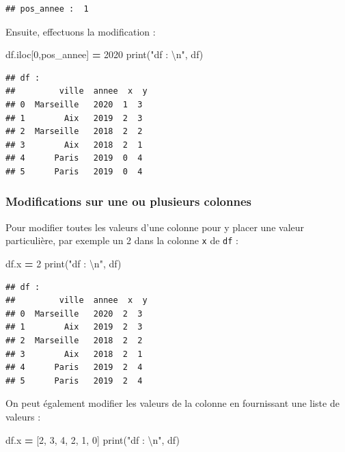 \documentclass[12pt,]{book}
\newenvironment{Shaded}{\begin{snugshade}}{\end{snugshade}}
\newcommand{\DecValTok}[1]{\textcolor[rgb]{0.00,0.00,0.81}{#1}}
\newcommand{\CharTok}[1]{\textcolor[rgb]{0.31,0.60,0.02}{#1}}
\newcommand{\StringTok}[1]{\textcolor[rgb]{0.31,0.60,0.02}{#1}}
\newcommand{\OperatorTok}[1]{\textcolor[rgb]{0.81,0.36,0.00}{\textbf{#1}}}
\newcommand{\BuiltInTok}[1]{#1}
\newcommand{\NormalTok}[1]{#1}
\numberwithin{equation}{section}
\numberwithin{countremarque}{section}
\begin{document}
\begin{lstlisting}
## pos_annee :  1
\end{lstlisting}

Ensuite, effectuons la modification :

\begin{Shaded}
\begin{Highlighting}[]
\NormalTok{df.iloc[}\DecValTok{0}\NormalTok{,pos_annee] }\OperatorTok{=} \DecValTok{2020}
\BuiltInTok{print}\NormalTok{(}\StringTok{"df : }\CharTok{\textbackslash{}n}\StringTok{"}\NormalTok{, df)}
\end{Highlighting}
\end{Shaded}

\begin{lstlisting}
## df : 
##         ville  annee  x  y
## 0  Marseille   2020  1  3
## 1        Aix   2019  2  3
## 2  Marseille   2018  2  2
## 3        Aix   2018  2  1
## 4      Paris   2019  0  4
## 5      Paris   2019  0  4
\end{lstlisting}

\subsubsection{Modifications sur une ou plusieurs
colonnes}\label{modifications-sur-une-ou-plusieurs-colonnes}

Pour modifier toutes les valeurs d'une colonne pour y placer une valeur
particulière, par exemple un 2 dans la colonne \texttt{x} de \texttt{df}
:

\begin{Shaded}
\begin{Highlighting}[]
\NormalTok{df.x }\OperatorTok{=} \DecValTok{2}
\BuiltInTok{print}\NormalTok{(}\StringTok{"df : }\CharTok{\textbackslash{}n}\StringTok{"}\NormalTok{, df)}
\end{Highlighting}
\end{Shaded}

\begin{lstlisting}
## df : 
##         ville  annee  x  y
## 0  Marseille   2020  2  3
## 1        Aix   2019  2  3
## 2  Marseille   2018  2  2
## 3        Aix   2018  2  1
## 4      Paris   2019  2  4
## 5      Paris   2019  2  4
\end{lstlisting}

On peut également modifier les valeurs de la colonne en fournissant une
liste de valeurs :

\begin{Shaded}
\begin{Highlighting}[]
\NormalTok{df.x }\OperatorTok{=}\NormalTok{ [}\DecValTok{2}\NormalTok{, }\DecValTok{3}\NormalTok{, }\DecValTok{4}\NormalTok{, }\DecValTok{2}\NormalTok{, }\DecValTok{1}\NormalTok{, }\DecValTok{0}\NormalTok{]}
\BuiltInTok{print}\NormalTok{(}\StringTok{"df : }\CharTok{\textbackslash{}n}\StringTok{"}\NormalTok{, df)}
\end{Highlighting}
\end{Shaded}
\end{document}
